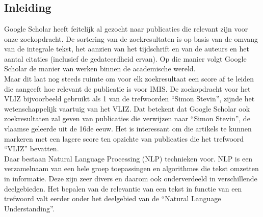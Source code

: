 
\chapter{}%
\label{ch:natural_language_processing}

\section{Inleiding}
Google Scholar heeft feitelijk al gezocht naar publicaties die relevant zijn voor onze zoekopdracht. De sortering van de zoekresultaten is op basis van de omvang van de integrale tekst, het aanzien van het tijdschrift en van de auteurs en het aantal citaties (inclusief de gedateerdheid ervan). Op die manier volgt Google Scholar de manier van werken binnen de academische wereld.\\
Maar dit laat nog steeds ruimte om voor elk zoekresultaat een score af te leiden die aangeeft hoe relevant de publicatie is voor IMIS. De zoekopdracht voor het VLIZ bijvoorbeeld gebruikt als 1 van de trefwoorden ``Simon Stevin'', zijnde het wetenschappelijk vaartuig van het VLIZ. Dat betekent dat Google Scholar ook zoekresultaten zal geven van publicaties die verwijzen naar ``Simon Stevin'', de vlaamse geleerde uit de 16de eeuw. Het is interessant om die artikels te kunnen markeren met een lagere score ten opzichte van publicaties die het trefwoord ``VLIZ'' bevatten.\\
Daar bestaan Natural Language Processing (NLP) technieken voor. NLP is een verzamelnaam van een hele groep toepassingen en algorithmes die tekst omzetten in informatie. Deze zijn zeer divers en daarom ook onderverdeeld in verschillende deelgebieden. Het bepalen van de relevantie van een tekst in functie van een trefwoord valt eerder onder het deelgebied van de ``Natural Language Understanding''.\\

